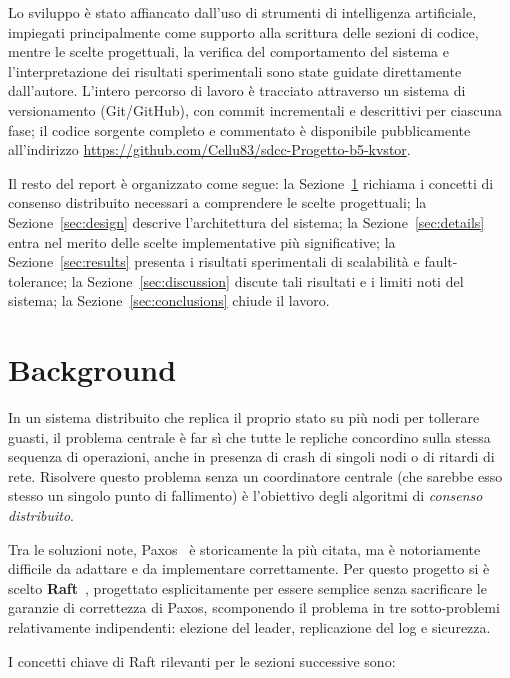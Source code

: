 \documentclass[conference]{IEEEtran}
\begin{document}
Lo sviluppo è stato affiancato dall'uso di strumenti di intelligenza
artificiale, impiegati principalmente come supporto alla scrittura delle
sezioni di codice, mentre le scelte progettuali, la verifica del
comportamento del sistema e l'interpretazione dei risultati sperimentali
sono state guidate direttamente dall'autore. L'intero percorso di lavoro è
tracciato attraverso un sistema di versionamento (Git/GitHub), con commit
incrementali e descrittivi per ciascuna fase; il codice sorgente completo
e commentato è disponibile pubblicamente all'indirizzo
\url{https://github.com/Cellu83/sdcc-Progetto-b5-kvstor}.

Il resto del report è organizzato come segue: la Sezione~\ref{sec:background}
richiama i concetti di consenso distribuito necessari a comprendere le
scelte progettuali; la Sezione~\ref{sec:design} descrive l'architettura
del sistema; la Sezione~\ref{sec:details} entra nel merito delle scelte
implementative più significative; la Sezione~\ref{sec:results} presenta
i risultati sperimentali di scalabilità e fault-tolerance; la
Sezione~\ref{sec:discussion} discute tali risultati e i limiti noti del
sistema; la Sezione~\ref{sec:conclusions} chiude il lavoro.

\section{Background}
\label{sec:background}

In un sistema distribuito che replica il proprio stato su più nodi per
tollerare guasti, il problema centrale è far sì che tutte le repliche
concordino sulla stessa sequenza di operazioni, anche in presenza di
crash di singoli nodi o di ritardi di rete. Risolvere questo problema
senza un coordinatore centrale (che sarebbe esso stesso un singolo punto
di fallimento) è l'obiettivo degli algoritmi di \emph{consenso
distribuito}.

Tra le soluzioni note, Paxos~\cite{lamport2001paxos} è storicamente la più
citata, ma è notoriamente difficile da adattare e da implementare
correttamente. Per questo progetto si è scelto
\textbf{Raft}~\cite{ongaro2014raft}, progettato esplicitamente per essere
semplice senza sacrificare le garanzie di correttezza di Paxos,
scomponendo il problema in tre sotto-problemi relativamente indipendenti:
elezione del leader, replicazione del log e sicurezza.

I concetti chiave di Raft rilevanti per le sezioni successive sono:
\end{document}

